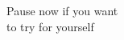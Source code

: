 \documentclass[preview]{standalone}
\begin{document}
\begin{center}
Pause now if you want\\  to try for yourself
\end{center}
\end{document}
